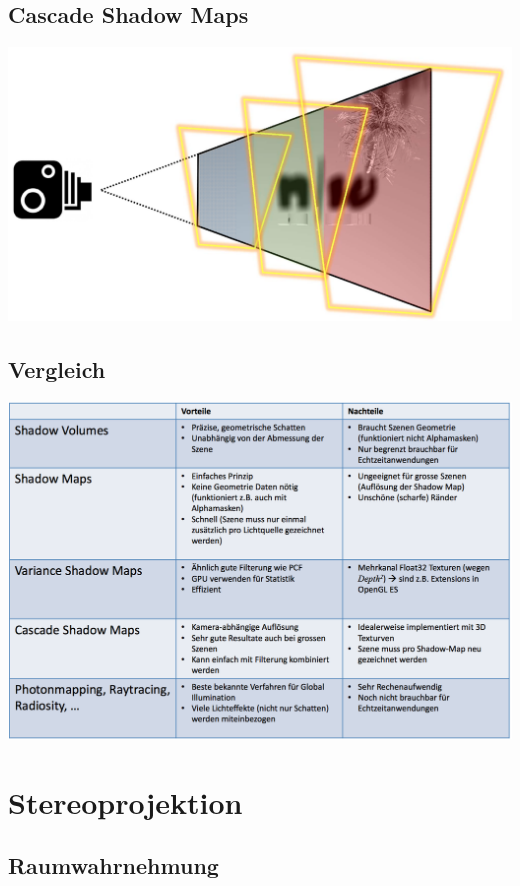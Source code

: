 \documentclass[10pt]{article}
\begin{document}
\subsection{Cascade Shadow Maps}
\begin{center}
	\includegraphics[scale=0.15]{cascade_shadow_maps.png}
\end{center}
\subsection{Vergleich}
\begin{center}
	\includegraphics[scale=0.35]{shadow_rendering.png}
\end{center}

\newpage
\section{Stereoprojektion}
\subsection{Raumwahrnehmung}
\end{document}

